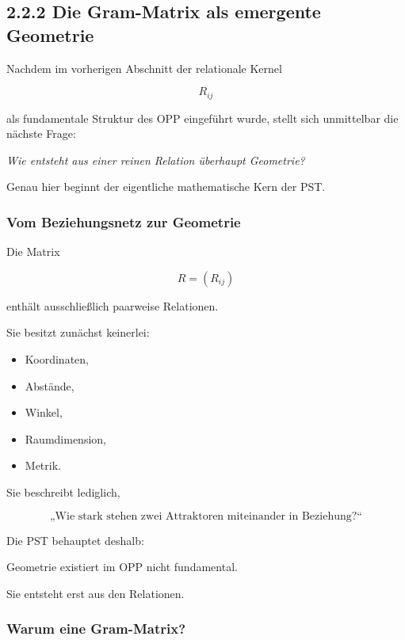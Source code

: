 \subsection{2.2.2 Die Gram-Matrix als emergente Geometrie}

Nachdem im vorherigen Abschnitt der relationale Kernel

\[
R_{ij}
\]

als fundamentale Struktur des OPP eingeführt wurde, stellt sich unmittelbar die nächste Frage:

\begin{center}
\emph{Wie entsteht aus einer reinen Relation überhaupt Geometrie?}
\end{center}

Genau hier beginnt der eigentliche mathematische Kern der PST.


\subsubsection*{Vom Beziehungsnetz zur Geometrie}

Die Matrix

\[
R=(R_{ij})
\]

enthält ausschließlich paarweise Relationen.

Sie besitzt zunächst keinerlei:

\begin{itemize}
\item Koordinaten,
\item Abstände,
\item Winkel,
\item Raumdimension,
\item Metrik.
\end{itemize}

Sie beschreibt lediglich,

\[
\text{„Wie stark stehen zwei Attraktoren miteinander in Beziehung?“}
\]

Die PST behauptet deshalb:

\begin{center}
Geometrie existiert im OPP nicht fundamental.

Sie entsteht erst aus den Relationen.
\end{center}


\subsubsection*{Warum eine Gram-Matrix?}

